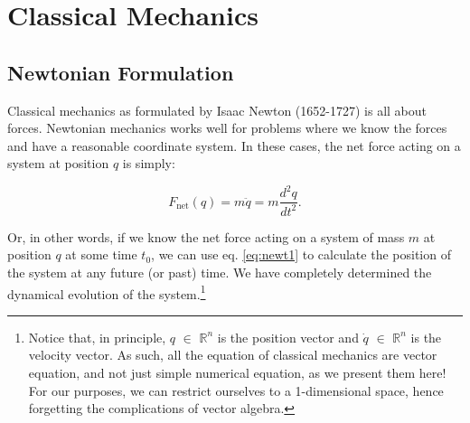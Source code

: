 \documentclass[
  9pt,
]{extbook}
\theoremstyle{definition}
\theoremstyle{definition}
\theoremstyle{definition}
\theoremstyle{remark}
\begin{document}
\hypertarget{classical-mechanics}{%
\section{Classical Mechanics}\label{classical-mechanics}}

\hypertarget{newtonian-formulation}{%
\subsection{Newtonian Formulation}\label{newtonian-formulation}}

Classical mechanics as formulated by Isaac Newton (1652-1727) is all about forces. Newtonian mechanics works well for problems where we know the forces and have a reasonable coordinate system. In these cases, the net force acting on a system at position \(q\) is simply:

\begin{equation}
F_{\mathrm{net}}(q) = m\ddot{q} = m \frac{d^2 q}{dt^2}.
\label{eq:newt1}
\end{equation}

Or, in other words, if we know the net force acting on a system of mass \(m\) at position \(q\) at some time \(t_0\), we can use eq. \eqref{eq:newt1} to calculate the position of the system at any future (or past) time. We have completely determined the dynamical evolution of the system.\footnote{Notice that, in principle, \(q\) \(\in\) \(\mathbb{R}^{n}\) is the position vector and \(\dot{q}\) \(\in\) \(\mathbb{R}^{n}\) is the velocity vector. As such, all the equation of classical mechanics are vector equation, and not just simple numerical equation, as we present them here! For our purposes, we can restrict ourselves to a 1-dimensional space, hence forgetting the complications of vector algebra.}
\end{document}

